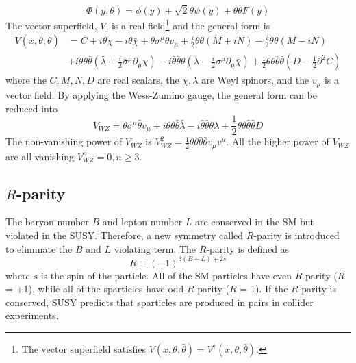 %
\begin{equation}
    \Phi(y, \theta) = \phi(y) + \sqrt{2} \theta \psi(y) + \theta \theta F(y)
    \label{eq:susy_chiral_superfield_general_form}
\end{equation}
%
The vector superfield, $V$, is a real field\footnote{The vector superfield satisfies $V(x, \theta, \bar{\theta}) = V^{\dagger}(x, \theta, \bar{\theta})$.} and the general form is
%
\begin{align}
    V(x, \theta, \bar{\theta}) &= C + i \theta \chi - i \bar{\theta} \bar{\chi} + \theta \sigma^{\mu} \bar{\theta} v_{\mu} + \frac{i}{2} \theta \theta (M + iN) - \frac{i}{2} \bar{\theta} \bar{\theta}(M - iN)\\
    &+ i \theta \theta \bar{\theta} (\bar{\lambda} + \frac{i}{2} \bar{\sigma}^{\mu} \partial_{\mu} \chi) - i \bar{\theta} \bar{\theta} \theta (\lambda - \frac{i}{2} \sigma^{\mu} \partial_{\mu} \bar{\chi}) + \frac{1}{2} \theta \theta \bar{\theta} \bar{\theta} (D - \frac{1}{2} \partial^{2} C)
    \label{eq:susy_vector_superfield_general_form}
\end{align}
%
where the $C, M, N, D$ are real scalars, the $\chi, \lambda$ are Weyl spinors, and the $v_{\mu}$ is a vector field.
By applying the Wess-Zumino gauge, the general form can be reduced into
%
\begin{equation}
    V_{WZ} = \theta \sigma^{\mu} \bar{\theta} v_{\mu} + i \theta \theta \bar{\theta} \bar{\lambda} - i \bar{\theta} \bar{\theta} \theta \lambda + \frac{1}{2} \theta \theta \bar{\theta} \bar{\theta} D
    \label{eq:susy_vector_superfield_reduced_form}
\end{equation}
%
The non-vanishing power of $V_{WZ}$ is $V^{2}_{WZ} = \frac{1}{2} \theta \theta \bar{\theta} \bar{\theta} v_{\mu} v^{\mu}$.
All the higher power of $V_{WZ}$ are all vanishing $V^{n}_{WZ} = 0, n \ge 3$.


\subsection{$R$-parity}
\label{subsec:susy_r_parity}
The baryon number $B$ and lepton number $L$ are conserved in the SM but violated in the SUSY.
Therefore, a new symmetry called $R$-parity is introduced to eliminate the $B$ and $L$ violating term.
The $R$-parity is defined as
%
\begin{equation}
    R \equiv (-1)^{3(B-L)+2s}
    \label{eq:susy_r_parity}
\end{equation}
%
where $s$ is the spin of the particle.
All of the SM particles have even $R$-parity ($R$ = +1), while all of the sparticles have odd $R$-parity ($R$ =  1). 
If the $R$-parity is conserved, SUSY predicts that sparticles are produced in pairs in collider experiments.

